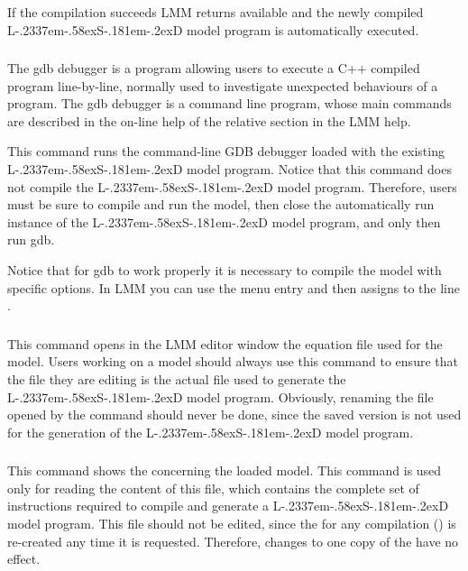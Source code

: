 \documentclass [11pt,a4paper] {book}
\def\LsD{{L\kern-.2337em\lower-.58ex\hbox{S}\kern-.181em\lower-.2ex\hbox{D}}\xspace}
\begin{document}
If the compilation succeeds LMM returns available and the newly compiled \LsD model program is automatically executed.

\subsubsection{}

The gdb debugger is a program allowing users to execute a C++ compiled program line-by-line, normally used to investigate unexpected behaviours of a program. The gdb debugger is a command line program, whose main commands are described in the on-line help of the relative section in the LMM help.

This command runs the command-line GDB debugger loaded with the existing \LsD model program. Notice that this command does not compile the \LsD model program. Therefore, users must be sure to compile and run the model, then close the automatically run instance of the \LsD model program, and only then run gdb.

Notice that for gdb to work properly it is necessary to compile the model with specific options. In LMM you can use the menu entry  and then assigns to the line .

\subsubsection{}
This command opens in the LMM editor window the equation file used for the model. Users working on a model should always use this command to ensure that the file they are editing is the actual file used to generate the \LsD model program. Obviously, renaming the file opened by the  command should never be done, since the saved version is not used for the generation of the \LsD model program.

\subsubsection{}

This command shows the  concerning the loaded model. This command is used only for reading the content of this file, which contains the complete set of instructions required to compile and generate a \LsD model program. This file should not be edited, since the  for any compilation () is re-created any time it is requested. Therefore, changes to one copy of the  have no effect.
\end{document}
